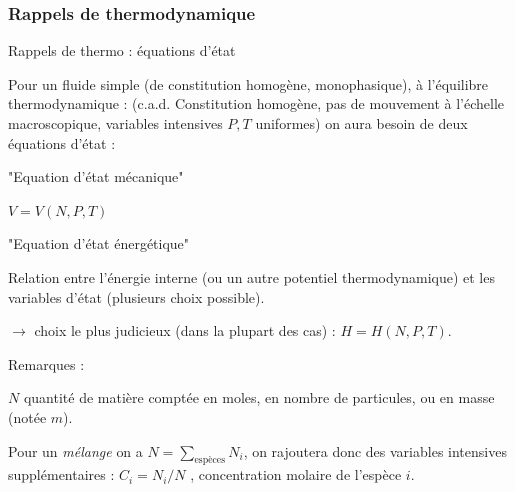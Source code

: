 \subsubsection{Rappels de thermodynamique}

\begin{frame}{Rappels de thermo : équations d'état}

Pour un fluide simple (de constitution homogène, monophasique), à l'équilibre thermodynamique :
(c.a.d. Constitution homogène, pas de mouvement à l'échelle macroscopique, variables intensives $P,T$ uniformes) on aura besoin de deux équations d'état :
 
\medskip
 
"Equation d'état mécanique"  

$V = V(N,P,T)$ 

\medskip

"Equation d'état énergétique"

Relation entre l'énergie interne (ou un autre potentiel thermodynamique) et les variables d'état (plusieurs choix possible).

$\rightarrow$ choix le plus judicieux (dans la plupart des cas) : $H=H(N,P,T)$.

\medskip

Remarques : 

$N$ quantité de matière comptée en moles, en nombre de particules, ou en masse (notée $m$).

Pour un {\em mélange } on a $N = \sum_{\mbox{espèces}} N_i$, on rajoutera donc des variables intensives supplémentaires : $C_i = N_i/N$ , concentration molaire de l'espèce $i$.

\end{frame}


